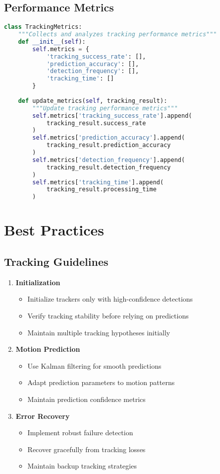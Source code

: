 \subsection{Performance Metrics}
\begin{lstlisting}[language=Python]
class TrackingMetrics:
    """Collects and analyzes tracking performance metrics"""
    def __init__(self):
        self.metrics = {
            'tracking_success_rate': [],
            'prediction_accuracy': [],
            'detection_frequency': [],
            'tracking_time': []
        }
        
    def update_metrics(self, tracking_result):
        """Update tracking performance metrics"""
        self.metrics['tracking_success_rate'].append(
            tracking_result.success_rate
        )
        self.metrics['prediction_accuracy'].append(
            tracking_result.prediction_accuracy
        )
        self.metrics['detection_frequency'].append(
            tracking_result.detection_frequency
        )
        self.metrics['tracking_time'].append(
            tracking_result.processing_time
        )
\end{lstlisting}

\section{Best Practices}

\subsection{Tracking Guidelines}
\begin{enumerate}
    \item \textbf{Initialization}
    \begin{itemize}
        \item Initialize trackers only with high-confidence detections
        \item Verify tracking stability before relying on predictions
        \item Maintain multiple tracking hypotheses initially
    \end{itemize}
    
    \item \textbf{Motion Prediction}
    \begin{itemize}
        \item Use Kalman filtering for smooth predictions
        \item Adapt prediction parameters to motion patterns
        \item Maintain prediction confidence metrics
    \end{itemize}
    
    \item \textbf{Error Recovery}
    \begin{itemize}
        \item Implement robust failure detection
        \item Recover gracefully from tracking losses
        \item Maintain backup tracking strategies
    \end{itemize}
\end{enumerate}